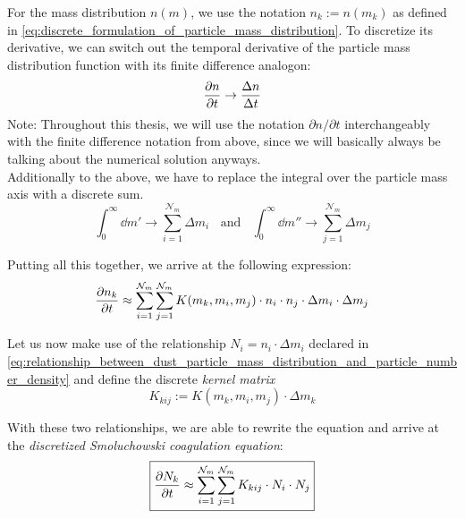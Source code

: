         For the mass distribution $n(m)$, we use the notation $n_k := n(m_k)$ as defined in
        \cref{eq:discrete_formulation_of_particle_mass_distribution}.
        To discretize its derivative, we can switch out the temporal derivative 
        of the particle mass distribution function with its finite difference analogon:
        \begin{equation}
            \frac{\partial n}{\partial t} \to \frac{\Delta n}{\Delta t}
        \end{equation}
        Note: Throughout this thesis, we will use the notation $\partial n/\partial t$ 
        interchangeably with the finite difference notation from above, since we will basically 
        always be talking about the numerical solution anyways. \\

        Additionally to the above, we have to replace the integral over the particle mass axis 
        with a discrete sum.
        \begin{equation}
            \int_0^\infty \dd m' \to \sum_{i=1}^{\mathcal N_m} \Delta m_i
            \ \ \ \ \text{and}\ \ \ \
            \int_0^\infty \dd m'' \to \sum_{j=1}^{\mathcal N_m} \Delta m_j
        \end{equation} 

        Putting all this together, we arrive at the following expression:
        \begin{equation}
            \label{eq:discrete_smoluchowski_equation}
            \frac{\partial n_k}{\partial t}
                \approx \sum_{i=1}^{\mathcal N_m}\sum_{j=1}^{\mathcal N_m}
                    K(m_k,m_i,m_j)\cdot n_i\cdot n_j\cdot\Delta m_i\cdot\Delta m_j
        \end{equation}
    
        Let us now make use of the relationship $N_i=n_i \cdot \Delta m_i$ declared in 
        \cref{eq:relationship_between_dust_particle_mass_distribution_and_particle_number_density}
        and define the discrete \textit{kernel matrix}
        \begin{equation}
            K_{kij} := K(m_k,m_i,m_j) \cdot \Delta m_k
        \end{equation}

        With these two relationships, we are able to rewrite the equation and
        arrive at the \textit{discretized Smoluchowski coagulation equation}:
        \begin{equation}
            \boxed{
            \frac{\partial N_k}{\partial t}
                \approx \sum_{i=1}^{\mathcal N_m}\sum_{j=1}^{\mathcal N_m} K_{kij}\cdot N_i\cdot N_j
            }
        \end{equation}
    
